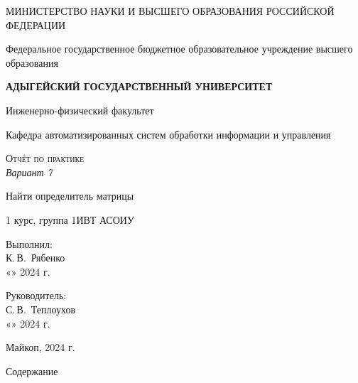 \documentclass[12pt,a4paper]{scrartcl}
\begin{document}
	\begin{titlepage}
		\begin{center}
			\large
			МИНИСТЕРСТВО НАУКИ И ВЫСШЕГО ОБРАЗОВАНИЯ РОССИЙСКОЙ ФЕДЕРАЦИИ
			
			Федеральное государственное бюджетное образовательное учреждение высшего образования
			
			\textbf{АДЫГЕЙСКИЙ ГОСУДАРСТВЕННЫЙ УНИВЕРСИТЕТ}
			\vspace{0.25cm}
			
			Инженерно-физический факультет
			
			Кафедра автоматизированных систем обработки информации и управления
			\vfill

			\vfill
			
			\textsc{Отчёт по практике}\\[5mm]
			
			\LARGE\textit{Вариант 7}
			
			{\LARGE Найти определитель матрицы}
			\bigskip
			
			1 курс, группа 1ИВТ АСОИУ
		\end{center}
		\vfill
		
		\newlength{\ML}
		\hfill\begin{minipage}{0.5\textwidth}
			Выполнил:\\
			\underline{\hspace{\ML}} К.\,В.~Рябенко\\
			«\underline{\hspace{0.7cm}}» \underline{\hspace{2cm}} 2024 г.
		\end{minipage}%
		\bigskip
		
		\hfill\begin{minipage}{0.5\textwidth}
			Руководитель:\\
			\underline{\hspace{\ML}} С.\,В.~Теплоухов\\
			«\underline{\hspace{0.7cm}}» \underline{\hspace{2cm}} 2024 г.
		\end{minipage}%
		
		
		\vfill
		
		
		
		\begin{center}
			
			Майкоп, 2024 г.
		\end{center}
	\end{titlepage}
\LARGE{Содержание}
\end{document}
